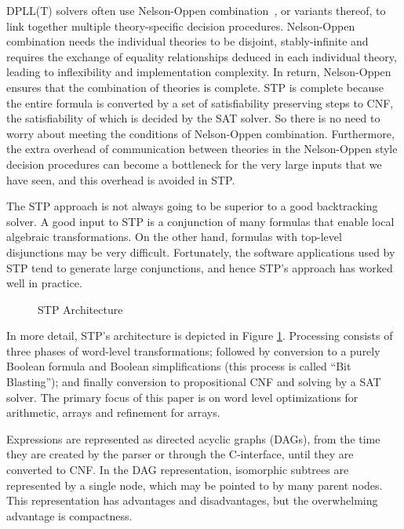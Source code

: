 DPLL(T) solvers often use Nelson-Oppen combination~\cite{nelsonoppen},
or variants thereof, to link together multiple theory-specific
decision procedures. Nelson-Oppen combination needs the individual
theories to be disjoint, stably-infinite and requires the exchange of
equality relationships deduced in each individual theory, leading to
inflexibility and implementation complexity.  In return, Nelson-Oppen
ensures that the combination of theories is complete. STP is complete
because the entire formula is converted by a set of satisfiability
preserving steps to CNF, the satisfiability of which is decided by the
SAT solver.  So there is no need to worry about meeting the conditions
of Nelson-Oppen combination. Furthermore, the extra overhead of
communication between theories in the Nelson-Oppen style decision
procedures can become a bottleneck for the very large inputs that we
have seen, and this overhead is avoided in STP.

The STP approach is not always going to be superior to a good
backtracking solver.  A good input to STP is a conjunction of many
formulas that enable local algebraic transformations.  On the other
hand, formulas with top-level disjunctions may be very
difficult. Fortunately, the software applications used by STP tend to
generate large conjunctions, and hence STP's approach has worked well
in practice.


\begin{figure}
\center
\epsfysize=1.5in
\epsfxsize=3in
\caption{STP Architecture}
\label{stparch}
\end{figure}

In more detail, STP's architecture is depicted in Figure
\ref{stparch}.  Processing consists of three phases of word-level
transformations; followed by conversion to a purely Boolean formula
and Boolean simplifications (this process is called ``Bit Blasting'');
and finally conversion to propositional CNF and solving by a SAT
solver.  The primary focus of this paper is on word level
optimizations for arithmetic, arrays and refinement for arrays.

Expressions are represented as directed acyclic graphs (DAGs), from
the time they are created by the parser or through the C-interface,
until they are converted to CNF.  In the DAG representation,
isomorphic subtrees are represented by a single node, which may be
pointed to by many parent nodes.  This representation has advantages
and disadvantages, but the overwhelming advantage is compactness.


